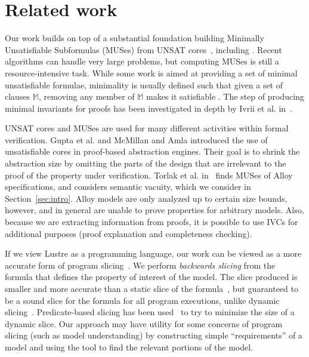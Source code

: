 \section{Related work}
\label{sec:related}


Our work builds on top of a substantial foundation building Minimally Unsatisfiable Subformulas
(MUSes) from UNSAT cores~\cite{Cimatti2007:UNSAT}, including \cite{marques2010minimal, belov2012towards, ryvchin2011faster, belov2012computing, nadel2010boosting}.  Recent algorithms can handle very large problems, but computing MUSes is still a resource-intensive task.  While some work is aimed at providing a set of minimal unsatisfiable formulae, minimality is usually defined such that given a set of clauses $\mathbb{M}$, removing any member of $\mathbb{M}$ makes it satisfiable \cite{belov2012computing}.  The step of producing minimal invariants for proofs has been investigated in depth by Ivrii et al. in~\cite{Ivrii14:invariants}.

UNSAT cores and MUSes are used for many different activities within
formal verification. Gupta et al. \cite{gupta2003iterative} and
McMillan and Amla \cite{mcmillan2003automatic} introduced the use of
unsatisfiable cores in proof-based abstraction engines. Their goal is
to shrink the abstraction size by omitting the parts of the design
that are irrelevant to the proof of the property under verification.
Torlak et al. in~\cite{Torlak08:cores} finds MUSes of Alloy
specifications, and considers semantic vacuity, which we consider in
Section~\ref{sec:intro}. Alloy models are only analyzed up to certain
size bounds, however, and in general are unable to prove properties
for arbitrary models. Also, because we are extracting information from
proofs, it is possible to use IVCs for additional purposes (proof
explanation and completeness checking).

If we view Lustre as a programming language, our work can be viewed as a more accurate form of program slicing~\cite{Tip95asurvey}.  We perform {\em backwards slicing} from the formula that defines the property of interest of the model.  The slice produced is smaller and more accurate than a static slice of the formula~\cite{Weiser:1981:slicing}, but guaranteed to be a sound slice for the formula for all program executions, unlike dynamic slicing~\cite{Agrawal:1990:slicing}.  Predicate-based slicing has been used~\cite{Li04:slicing} to try to minimize the size of a dynamic slice.  Our approach may have utility for some concerns of program slicing (such as model understanding) by constructing simple ``requirements'' of a model and using the tool to find the relevant portions of the model.

